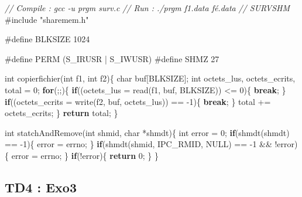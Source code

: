 \documentclass[
]{article}
\newenvironment{Shaded}{}{}
\newcommand{\CommentTok}[1]{\textcolor[rgb]{0.38,0.63,0.69}{\textit{#1}}}
\newcommand{\ControlFlowTok}[1]{\textcolor[rgb]{0.00,0.44,0.13}{\textbf{#1}}}
\newcommand{\DataTypeTok}[1]{\textcolor[rgb]{0.56,0.13,0.00}{#1}}
\newcommand{\DecValTok}[1]{\textcolor[rgb]{0.25,0.63,0.44}{#1}}
\newcommand{\ImportTok}[1]{#1}
\newcommand{\NormalTok}[1]{#1}
\newcommand{\PreprocessorTok}[1]{\textcolor[rgb]{0.74,0.48,0.00}{#1}}
\begin{document}
\begin{Shaded}
\begin{Highlighting}[]
\CommentTok{// Compile : gcc {-}u prgm surv.c}
\CommentTok{// Run : ./prgm f1.data fé.data}
\CommentTok{// SURVSHM}
\PreprocessorTok{\#include }\ImportTok{"sharemem.h"}

\PreprocessorTok{\#define BLKSIZE 1024}

\PreprocessorTok{\#define PERM (S\_IRUSR | S\_IWUSR)}
\PreprocessorTok{\#define SHMZ 27}

\DataTypeTok{int}\NormalTok{ copierfichier(}\DataTypeTok{int}\NormalTok{ f1, }\DataTypeTok{int}\NormalTok{ f2)\{}
    \DataTypeTok{char}\NormalTok{ buf[BLKSIZE];}
    \DataTypeTok{int}\NormalTok{ octets\_lus, octets\_ecrits, total = }\DecValTok{0}\NormalTok{;}
    \ControlFlowTok{for}\NormalTok{(;;)\{}
        \ControlFlowTok{if}\NormalTok{((octets\_lus = read(f1, buf, BLKSIZE)) \textless{}= }\DecValTok{0}\NormalTok{)\{}
            \ControlFlowTok{break}\NormalTok{;}
\NormalTok{        \}}
        \ControlFlowTok{if}\NormalTok{((octets\_ecrits = write(f2, buf, octets\_lus)) == {-}}\DecValTok{1}\NormalTok{)\{}
            \ControlFlowTok{break}\NormalTok{;}
\NormalTok{        \}}
\NormalTok{        total += octets\_ecrits;}
\NormalTok{    \}}
    \ControlFlowTok{return}\NormalTok{ total;}
\NormalTok{\}}

\DataTypeTok{int}\NormalTok{ statchAndRemove(}\DataTypeTok{int}\NormalTok{ shmid, }\DataTypeTok{char}\NormalTok{ *shmdt)\{}
    \DataTypeTok{int}\NormalTok{ error = }\DecValTok{0}\NormalTok{;}
    \ControlFlowTok{if}\NormalTok{(shmdt(shmdt) == {-}}\DecValTok{1}\NormalTok{)\{}
\NormalTok{        error = errno;}
\NormalTok{    \}}
    \ControlFlowTok{if}\NormalTok{(shmdt(shmid, IPC\_RMID, NULL) == {-}}\DecValTok{1}\NormalTok{ \&\& !error)\{}
\NormalTok{        error = errno;}
\NormalTok{    \}}
    \ControlFlowTok{if}\NormalTok{(!error)\{}
        \ControlFlowTok{return} \DecValTok{0}\NormalTok{;}
\NormalTok{    \}}
\NormalTok{\}}
\end{Highlighting}
\end{Shaded}

\hypertarget{td4-exo3}{%
\subsection{TD4 : Exo3}\label{td4-exo3}}
\end{document}
